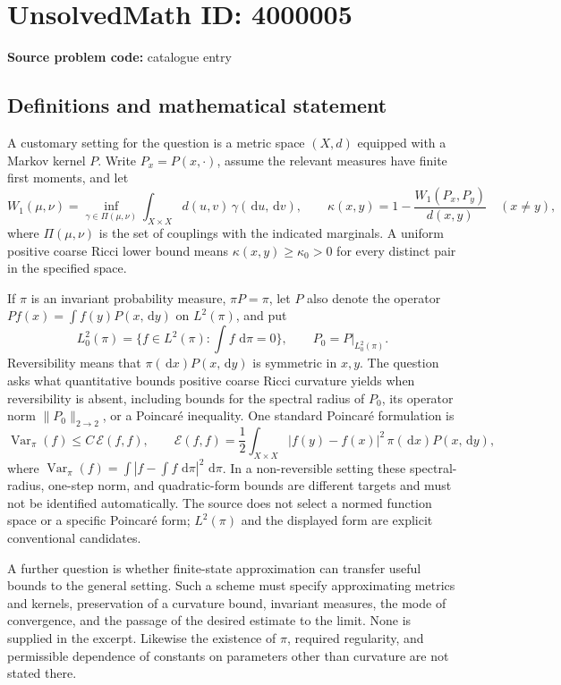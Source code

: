 \documentclass[11pt]{article}
\newcommand{\dd}{\,\mathrm{d}}
\begin{document}
\section*{UnsolvedMath ID: 4000005}
\textbf{Source problem code:} catalogue entry
\subsection{Definitions and mathematical statement}
A customary setting for the question is a metric space \((X,d)\) equipped with a Markov kernel \(P\). Write \(P_x=P(x,\cdot)\), assume the relevant measures have finite first moments, and let
\[
 W_1(\mu,\nu)=\inf_{\gamma\in\Pi(\mu,\nu)}\int_{X\times X}d(u,v)\,\gamma(\dd u,\dd v),
 \qquad
 \kappa(x,y)=1-\frac{W_1(P_x,P_y)}{d(x,y)}\quad(x\ne y),
\]
where \(\Pi(\mu,\nu)\) is the set of couplings with the indicated marginals. A uniform positive coarse Ricci lower bound means \(\kappa(x,y)\ge\kappa_0>0\) for every distinct pair in the specified space.

If \(\pi\) is an invariant probability measure, \(\pi P=\pi\), let \(P\) also denote the operator \(Pf(x)=\int f(y)P(x,\dd y)\) on \(L^2(\pi)\), and put
\[
 L^2_0(\pi)=\{f\in L^2(\pi):\textstyle\int f\,\dd\pi=0\},
 \qquad P_0=P|_{L^2_0(\pi)}.
\]
Reversibility means that \(\pi(\dd x)P(x,\dd y)\) is symmetric in \(x,y\). The question asks what quantitative bounds positive coarse Ricci curvature yields when reversibility is absent, including bounds for the spectral radius of \(P_0\), its operator norm \(\|P_0\|_{2\to2}\), or a Poincar\'e inequality. One standard Poincar\'e formulation is
\[
 \operatorname{Var}_{\pi}(f)\le C\,\mathcal E(f,f),\qquad
 \mathcal E(f,f)=\frac12\int_{X\times X}|f(y)-f(x)|^2\,\pi(\dd x)P(x,\dd y),
\]
where \(\operatorname{Var}_{\pi}(f)=\int|f-\int f\,\dd\pi|^2\,\dd\pi\). In a non-reversible setting these spectral-radius, one-step norm, and quadratic-form bounds are different targets and must not be identified automatically. The source does not select a normed function space or a specific Poincar\'e form; \(L^2(\pi)\) and the displayed form are explicit conventional candidates.

A further question is whether finite-state approximation can transfer useful bounds to the general setting. Such a scheme must specify approximating metrics and kernels, preservation of a curvature bound, invariant measures, the mode of convergence, and the passage of the desired estimate to the limit. None is supplied in the excerpt. Likewise the existence of \(\pi\), required regularity, and permissible dependence of constants on parameters other than curvature are not stated there.
\end{document}
